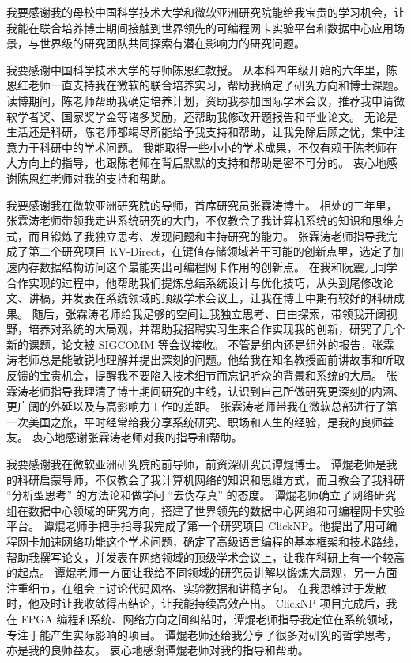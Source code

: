 
\begin{acknowledgements}

我要感谢我的母校中国科学技术⼤学和微软亚洲研究院能给我宝贵的学习机会，让我能在联合培养博士期间接触到世界领先的可编程网卡实验平台和数据中心应用场景，与世界级的研究团队共同探索有潜在影响力的研究问题。

我要感谢中国科学技术⼤学的导师陈恩红教授。
从本科四年级开始的六年里，陈恩红老师一直支持我在微软的联合培养实习，帮助我确定了研究方向和博士课题。
读博期间，陈老师帮助我确定培养计划，资助我参加国际学术会议，推荐我申请微软学者奖、国家奖学金等诸多奖励，还帮助我修改开题报告和毕业论文。
无论是生活还是科研，陈老师都竭尽所能给予我⽀持和帮助，让我免除后顾之忧，集中注意⼒于科研中的学术问题。
我能取得一些小小的学术成果，不仅有赖于陈⽼师在大方向上的指导，也跟陈老师在背后默默的⽀持和帮助是密不可分的。
衷心地感谢陈恩红老师对我的支持和帮助。

我要感谢我在微软亚洲研究院的导师，首席研究员张霖涛博士。
相处的三年里，张霖涛老师带领我走进系统研究的大门，不仅教会了我计算机系统的知识和思维方式，而且锻炼了我独立思考、发现问题和主持研究的能力。
张霖涛老师指导我完成了第二个研究项目 KV-Direct，在键值存储领域若干可能的创新点里，选定了加速内存数据结构访问这个最能突出可编程网卡作用的创新点。
在我和阮震元同学合作实现的过程中，他帮助我们提炼总结系统设计与优化技巧，从头到尾修改论文、讲稿，并发表在系统领域的顶级学术会议上，让我在博士中期有较好的科研成果。
随后，张霖涛老师给我足够的空间让我独立思考、自由探索，带领我开阔视野，培养对系统的大局观，并帮助我招聘实习生来合作实现我的创新，研究了几个新的课题，论文被 SIGCOMM 等会议接收。
不管是组内还是组外的报告，张霖涛老师总是能敏锐地理解并提出深刻的问题。他给我在知名教授面前讲故事和听取反馈的宝贵机会，提醒我不要陷入技术细节而忘记听众的背景和系统的大局。
张霖涛老师指导我理清了博士期间研究的主线，认识到自己所做研究更深刻的内涵、更广阔的外延以及与高影响力工作的差距。
张霖涛老师带我在微软总部进行了第一次美国之旅，平时经常给我分享系统研究、职场和人生的经验，是我的良师益友。
衷心地感谢张霖涛老师对我的指导和帮助。

我要感谢我在微软亚洲研究院的前导师，前资深研究员谭焜博⼠。
谭焜老师是我的科研启蒙导师，不仅教会了我计算机⽹络的知识和思维⽅式，⽽且教会了我科研 ``分析型思考'' 的⽅法论和做学问 ``去伪存真'' 的态度。
谭焜老师确立了网络研究组在数据中心领域的研究方向，搭建了世界领先的数据中心网络和可编程网卡实验平台。
谭焜老师手把手指导我完成了第一个研究项目 ClickNP。他提出了用可编程网卡加速网络功能这个学术问题，确定了高级语言编程的基本框架和技术路线，帮助我撰写论文，并发表在网络领域的顶级学术会议上，让我在科研上有一个较高的起点。
谭焜老师一方面让我给不同领域的研究员讲解以锻炼大局观，另一方面注重细节，在组会上讨论代码风格、实验数据和讲稿字句。
在我思维过于发散时，他及时让我收敛得出结论，让我能持续高效产出。
ClickNP 项目完成后，我在 FPGA 编程和系统、网络方向之间纠结时，谭焜老师指导我定位在系统领域，专注于能产生实际影响的项目。
谭焜老师还给我分享了很多对研究的哲学思考，亦是我的良师益友。
衷⼼地感谢谭焜⽼师对我的指导和帮助。



\end{acknowledgements}
